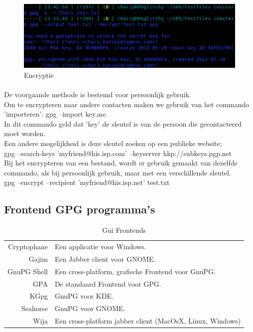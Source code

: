 \documentclass[12pt]{article}
\begin{document}
				\begin{figure}[!ht]
					\begin{center}
						\includegraphics[scale=0.4]{Pictures/Encryptie}
					\end{center}
					\caption{Encryptie}\label{Encryptie}
				\end{figure}
				
				\paragraph{}
				De voorgaande methode is bestemd voor persoonlijk gebruik.\\
				Om te encrypteren naar andere contacten maken we gebruik van het commando 
				'importeren': gpg --import key.asc\\
				In dit commando geld dat 'key' de sleutel is van de persoon die gecontacteerd
				moet worden.\\
				Een andere mogelijkheid is deze sleutel zoeken op een publieke website;\\
				gpg --search-keys 'myfriend@his.isp.com' --keyserver hkp://subkeys.pgp.net\\
				Bij het encrypteren van een bestand, wordt er gebruik gemaakt van dezelfde commando,
				als bij persoonlijk gebruik, maar met een verschillende sleutel.\\
				gpg --encrypt --recipient 'myfriend@his.isp.net' test.txt\\		
				\cite{GPGstart}
			
			\subsection{Frontend GPG programma's}\label{GUI} \cite{Frontend} 
				\begin{table}[!ht]
					\begin{center}
						\begin{tabular}{r|l}
							Cryptophane	&	Een applicatie voor Windows.\\
							Gajim		&	Een Jabber client voor GNOME.\\ \index{Jabber client}
							GnuPG Shell	&	Een cross-platform, grafische Frontend voor GnuPG.\\ \index{Cross-platform}
							GPA			&	De standaard Frontend voor GPG.\\
							KGpg		&	GnuPG voor KDE.\\ \index{KDE}
							Seahorse	&	GnuPG voor GNOME.\\ \index{GNOME}
							Wija		&	Een cross-platform jabber client (MacOsX, Linux, Windows)\\
						\end{tabular}
					\end{center}
					\caption{Gui Frontends} 
				\end{table}
				
\end{document}

